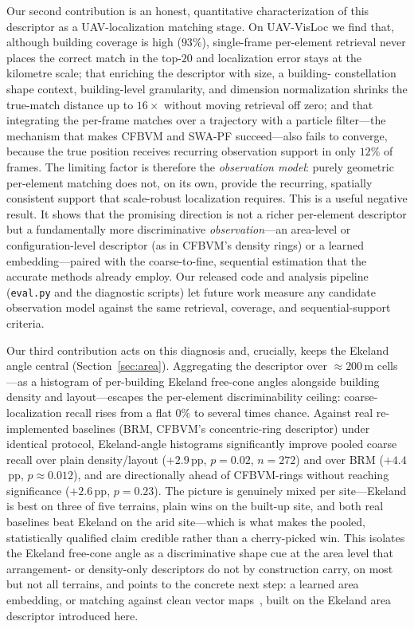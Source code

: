 \documentclass[10pt]{article}
\theoremstyle{plain}
\theoremstyle{definition}
\begin{document}
Our second contribution is an honest, quantitative characterization of this
descriptor as a UAV-localization matching stage. On UAV-VisLoc we find that,
although building coverage is high ($93\%$), single-frame per-element retrieval
never places the correct match in the top-$20$ and localization error stays at
the kilometre scale; that enriching the descriptor with size, a building-
constellation shape context, building-level granularity, and dimension
normalization shrinks the true-match distance up to $16\times$ without moving
retrieval off zero; and that integrating the per-frame matches over a trajectory
with a particle filter---the mechanism that makes CFBVM and SWA-PF
succeed---also fails to converge, because the true position receives recurring
observation support in only $12\%$ of frames.
The limiting factor is therefore the \emph{observation model}: purely geometric
per-element matching does not, on its own, provide the recurring, spatially
consistent support that scale-robust localization requires.
This is a useful negative result. It shows that the promising direction is not
a richer per-element descriptor but a fundamentally more discriminative
\emph{observation}---an area-level or configuration-level descriptor (as in
CFBVM's density rings) or a learned embedding---paired with the coarse-to-fine,
sequential estimation that the accurate methods already employ. Our released
code and analysis pipeline (\texttt{eval.py} and the diagnostic scripts) let
future work measure any candidate observation model against the same
retrieval, coverage, and sequential-support criteria.

Our third contribution acts on this diagnosis and, crucially, keeps the Ekeland
angle central (Section~\ref{sec:area}). Aggregating the descriptor over
${\approx}200$\,m cells---as a histogram of per-building Ekeland free-cone
angles alongside building density and layout---escapes the per-element
discriminability ceiling: coarse-localization recall rises from a flat $0\%$ to
several times chance. Against real re-implemented baselines (BRM, CFBVM's
concentric-ring descriptor) under identical protocol, Ekeland-angle histograms
significantly improve pooled coarse recall over plain density/layout
($+2.9$\,pp, $p{=}0.02$, $n{=}272$) and over BRM ($+4.4$\,pp, $p{\approx}0.012$),
and are directionally ahead of CFBVM-rings without reaching significance
($+2.6$\,pp, $p{=}0.23$). The picture is genuinely mixed per site---Ekeland
is best on three of five terrains, plain wins on the built-up site, and both
real baselines beat Ekeland on the arid site---which is what makes the pooled,
statistically qualified claim credible rather than a cherry-picked win. This
isolates the Ekeland free-cone angle as a discriminative shape cue at the
area level that arrangement- or density-only descriptors do not by
construction carry, on most but not all terrains, and points to the concrete
next step: a learned area embedding, or matching against clean vector
maps~\cite{ssrm2024}, built on the Ekeland area descriptor introduced here.
\end{document}
